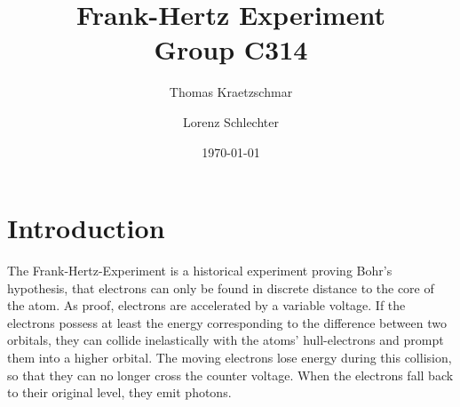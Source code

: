 \documentclass[a4paper,11pt,twoside]{article}
\title{%
	{\Huge Frank-Hertz Experiment}\\[0.5\baselineskip] 
	{\normalsize Group C314}
    }
\author{%
    Thomas Kraetzschmar 
	\and Lorenz Schlechter
	}
\date{\today}
\begin{document}
\pagestyle{fancy}

\maketitle

\clearpage


\tableofcontents
\clearpage
\pagestyle{fancy}

\section{Introduction}
The Frank-Hertz-Experiment is a historical experiment proving Bohr's hypothesis, that electrons can only be found in discrete distance to the core of the atom. As proof, electrons are accelerated by a variable voltage. If the electrons possess at least the energy corresponding to the difference between two orbitals, they can collide inelastically with the atoms' hull-electrons and prompt them into a higher orbital. The moving electrons lose energy during this collision, so that they can no longer cross the counter voltage. When the electrons fall back to their original level, they emit photons.
\end{document}

